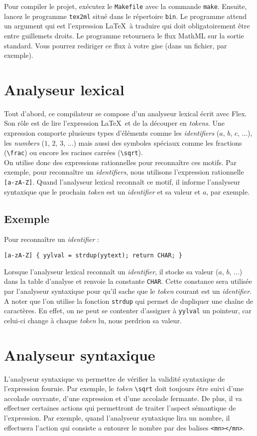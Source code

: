 \documentclass{article}
\begin{document}
Pour compiler le projet, exécutez le \verb|Makefile| avec la commande \verb|make|. Ensuite, lancez le programme \verb|tex2ml| situé dans le répertoire \verb|bin|.
Le programme attend un argument qui est l'expression \LaTeX\ à traduire qui doit obligatoirement être entre guillemets droits. Le programme retournera le flux MathML sur la sortie standard. Vous pourrez rediriger ce flux à votre gise (dans un fichier, par exemple). 

\section{Analyseur lexical}
Tout d'abord, ce compilateur se compose d'un analyseur lexical écrit avec Flex. Son rôle est de lire l'expression \LaTeX\ et de la découper en \textit{tokens}. Une expression comporte plusieurs types d'éléments comme les \textit{identifiers} ($a$, $b$, $c$, ...), les \textit{numbers} ($1$, $2$, $3$, ...) mais aussi des symboles spéciaux comme les fractions (\verb|\frac|) ou encore les racines carrées (\verb|\sqrt|).\\

On utilise donc des expressions rationnelles pour reconnaître ces motifs. Par exemple, pour reconnaître un \textit{identifiers}, nous utilisons l'expression rationnelle \verb|[a-zA-Z]|. Quand l'analyseur lexical reconnaît ce motif, il informe l'analyseur syntaxique que le prochain \textit{token} est un \textit{identifier} et sa valeur et $a$, par exemple.
\clearpage

\subsection*{Exemple}
Pour reconnaître un \textit{identifier} :
\begin{verbatim}
[a-zA-Z] { yylval = strdup(yytext); return CHAR; }
\end{verbatim}
Lorsque l'analyseur lexical reconnaît un \textit{identifier}, il stocke sa valeur ($a$, $b$, ...) dans la table d'analyse et renvoie la constante \verb|CHAR|. Cette constance sera utilisée par l'analyseur syntaxique pour qu'il sache que le \textit{token} courant est un \textit{identifier}.\\
A noter que l'on utilise la fonction \verb|strdup| qui permet de dupliquer une chaîne de caractères. En effet, on ne peut se contenter d'assigner à \verb|yylval| un pointeur, car celui-ci change à chaque \textit{token} lu, nous perdrion sa valeur.

\section{Analyseur syntaxique}
L'analyseur syntaxique va permettre de vérifier la validité syntaxique de l'expression fournie. Par exemple, le \textit{token} \verb|\sqrt| doit toujours être suivi d'une accolade ouvrante, d'une expression et d'une accolade fermante. De plus, il va effectuer certaines actions qui permettront de traiter l'aspect sémantique de l'expression. Par exemple, quand l'analyseur syntaxique lira un nombre, il effectuera l'action qui consiste a entourer le nombre par des balises \verb|<mn></mn>|.
\end{document}
